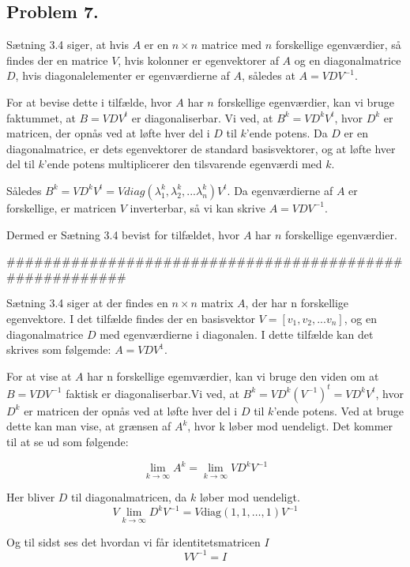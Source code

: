 \subsection*{Problem 7.}

Sætning 3.4 siger, at hvis $A$ er en $n \times n$ matrice med $n$ forskellige egenværdier, så findes der en matrice $V$, hvis kolonner er egenvektorer af $A$ og en diagonalmatrice $D$, hvis diagonalelementer er egenværdierne af $A$, således at $A = VDV^{-1}$.

For at bevise dette i tilfælde, hvor $A$ har $n$ forskellige egenværdier, kan vi bruge faktummet, at $B = V DV^{t}$ er diagonaliserbar. Vi ved, at $B^k = V D^{k} V^{t}$, hvor $D^{k}$ er matricen, der opnås ved at løfte hver del i $D$ til $k$'ende potens. Da $D$ er en diagonalmatrice, er dets egenvektorer de standard basisvektorer, og at løfte hver del til $k$'ende potens multiplicerer den tilsvarende egenværdi med $k$.

Således $B^k = V D^{k} V^{t} = V diag(\lambda_1^k, \lambda_2^k, . . . \lambda_n^k) V^{t}$. Da egenværdierne af $A$ er forskellige, er matricen $V$ inverterbar, så vi kan skrive $A = VDV^{-1}$.

Dermed er Sætning 3.4 bevist for tilfældet, hvor $A$ har $n$ forskellige egenværdier.



########################################################


Sætning 3.4 siger at der findes en $n \times n$ matrix $A$, der har n forskellige egenvektore. I det tilfælde findes der en basisvektor $V = [v_1,v_2,...v_n]$, og en diagonalmatrice $D$ med egenværdierne i diagonalen. I dette tilfælde kan det skrives som følgemde: $A=VDV^1$.

For at vise at $A$ har n forskellige egemværdier, kan vi bruge den viden om at $B = VDV^{-1}$ faktisk er diagonaliserbar.Vi ved, at $B^k = V D^k (V^{-1})^t = V D^k V^t$, hvor $D^k$ er matricen der opnås ved at løfte hver del i $D$ til $k$'ende potens. Ved at bruge dette kan man vise, at grænsen af $A^k$, hvor k løber mod uendeligt. Det kommer til at se ud som følgende:

$$\lim_{k \rightarrow \infty} A^k = \lim_{k \rightarrow \infty} V D^k V^{-1} $$

Her bliver $D$ til diagonalmatricen, da $k$ løber mod uendeligt. 
$$V \lim_{k \rightarrow \infty} D^k V^{-1} = V \text{diag}(1, 1, \dots, 1) V^{-1} $$

Og til sidst ses det hvordan vi får identitetsmatricen $I$
$$ VV^{-1} = I$$

